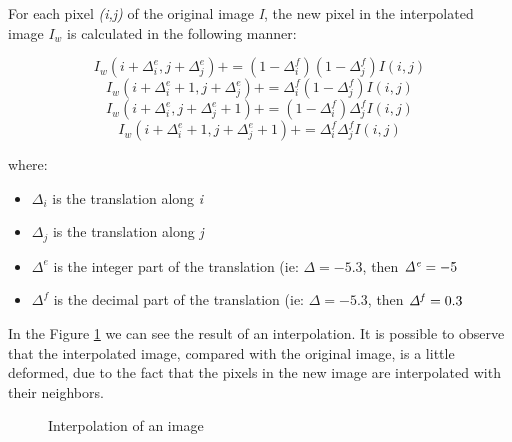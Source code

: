 \documentclass{article}
\begin{document}
	For each pixel {\it(i,j)} of the original image {\it I}, the new pixel in the interpolated image {\it $I_w$} is calculated in the following manner:

	\begin{equation}
		I_w(i+\Delta_i^e , j+\Delta_j^e) += (1-\Delta_i^f)(1-\Delta_j^f)I(i,j)
	\end{equation}
	\begin{equation}
		I_w(i+\Delta_i^e+1 , j+\Delta_j^e) += \Delta_i^f(1-\Delta_j^f)I(i,j)
	\end{equation}
	\begin{equation}
  		I_w(i+\Delta_i^e , j+\Delta_j^e+1) += (1-\Delta_i^f)\Delta_j^fI(i,j)
	\end{equation}
	\begin{equation}
		I_w(i+\Delta_i^e+1 , j+\Delta_j^e+1) += \Delta_i^f \Delta_j^fI(i,j)
	\end{equation}

	where: 
		\begin{itemize}
			\item {\it $\Delta_i$} is the translation along {\it i}
			\item {\it $\Delta_j$} is the translation along {\it j} 
			\item {\it $\Delta^e$} is the integer part of the translation (ie: $\Delta=-5.3$, then ${\it \Delta^e}=-5$
			\item {\it $\Delta^f$} is the decimal part of the translation (ie: $\Delta=-5.3$, then ${\it \Delta^f}=0.3$
		\end{itemize}

	In the Figure \ref{fig:interp} we can see the result of an interpolation. It is possible to observe that the interpolated image, compared with the original image, is a little deformed, due to the fact that the pixels in the new image are interpolated with their neighbors.

	\begin{figure}[H]
		  \centering
		  \hspace{0.1cm}
		  \caption{Interpolation of an image}
		  \label{fig:interp}
	\end{figure}	
\end{document}
